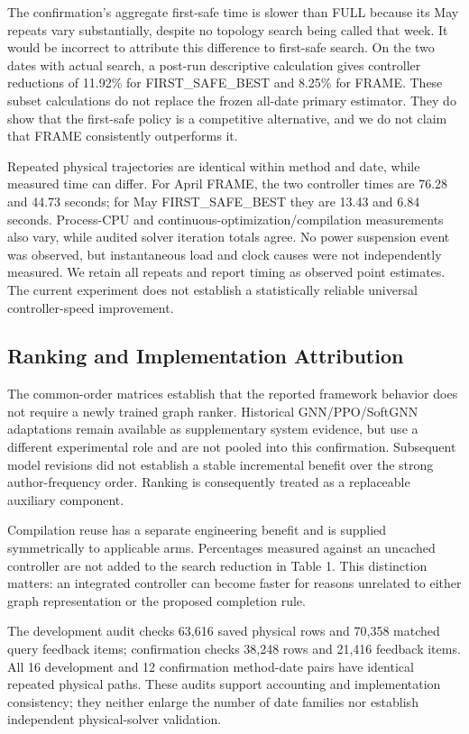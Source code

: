 \documentclass[letterpaper]{article}
\begin{document}
The confirmation's aggregate first-safe time is slower than FULL because its May repeats vary substantially, despite no topology search being called that week. It would be incorrect to attribute this difference to first-safe search. On the two dates with actual search, a post-run descriptive calculation gives controller reductions of 11.92\% for FIRST\_SAFE\_BEST and 8.25\% for FRAME. These subset calculations do not replace the frozen all-date primary estimator. They do show that the first-safe policy is a competitive alternative, and we do not claim that FRAME consistently outperforms it.


Repeated physical trajectories are identical within method and date, while measured time can differ. For April FRAME, the two controller times are 76.28 and 44.73 seconds; for May FIRST\_SAFE\_BEST they are 13.43 and 6.84 seconds. Process-CPU and continuous-optimization/compilation measurements also vary, while audited solver iteration totals agree. No power suspension event was observed, but instantaneous load and clock causes were not independently measured. We retain all repeats and report timing as observed point estimates. The current experiment does not establish a statistically reliable universal controller-speed improvement.


\subsection{Ranking and Implementation Attribution}

The common-order matrices establish that the reported framework behavior does not require a newly trained graph ranker. Historical GNN/PPO/SoftGNN adaptations remain available as supplementary system evidence, but use a different experimental role and are not pooled into this confirmation. Subsequent model revisions did not establish a stable incremental benefit over the strong author-frequency order. Ranking is consequently treated as a replaceable auxiliary component.


Compilation reuse has a separate engineering benefit and is supplied symmetrically to applicable arms. Percentages measured against an uncached controller are not added to the search reduction in Table 1. This distinction matters: an integrated controller can become faster for reasons unrelated to either graph representation or the proposed completion rule.


The development audit checks 63,616 saved physical rows and 70,358 matched query feedback items; confirmation checks 38,248 rows and 21,416 feedback items. All 16 development and 12 confirmation method-date pairs have identical repeated physical paths. These audits support accounting and implementation consistency; they neither enlarge the number of date families nor establish independent physical-solver validation.
\end{document}
